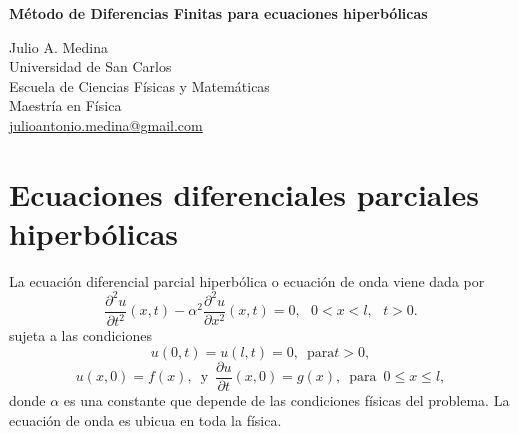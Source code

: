 \documentclass[a4paper]{article}
\begin{document}

\Large
 \begin{center}
\textbf{Método de Diferencias Finitas para ecuaciones hiperbólicas\\}


\hspace{10pt}

\large
Julio A. Medina\\
\hspace{10pt}
\small  
Universidad de San Carlos\\
Escuela de Ciencias Físicas y Matemáticas\\
Maestría en Física\\
\href{mailto:julioantonio.medina@gmail.com}{julioantonio.medina@gmail.com}\\

\end{center}

\hspace{10pt}

\normalsize
\section{Ecuaciones diferenciales parciales hiperbólicas}
La ecuación diferencial parcial hiperbólica o ecuación de onda viene dada por
\begin{equation}\label{eq::hyperbolic_partial_diff}
\frac{\partial^2 u}{\partial t^2}(x,t) - \alpha^2 \frac{\partial^2 u}{\partial x^2}(x,t)=0,\,\,\,\, 0<x<l, \,\,\,\, t>0.
\end{equation}
sujeta a las condiciones
\begin{equation}
u(0,t)=u(l,t)=0,\,\,\,\text{para} t>0, 
\end{equation}
\begin{equation}
u(x,0)=f(x),\,\,\, \text{y}\,\,\,\frac{\partial u}{\partial t}(x,0)=g(x),\,\,\, \text{para}\,\,\, 0\leq x\leq l,
\end{equation}
donde $\alpha$ es una constante que depende de las condiciones físicas del problema. La ecuación de onda es ubicua en toda la física. \\
\end{document}
